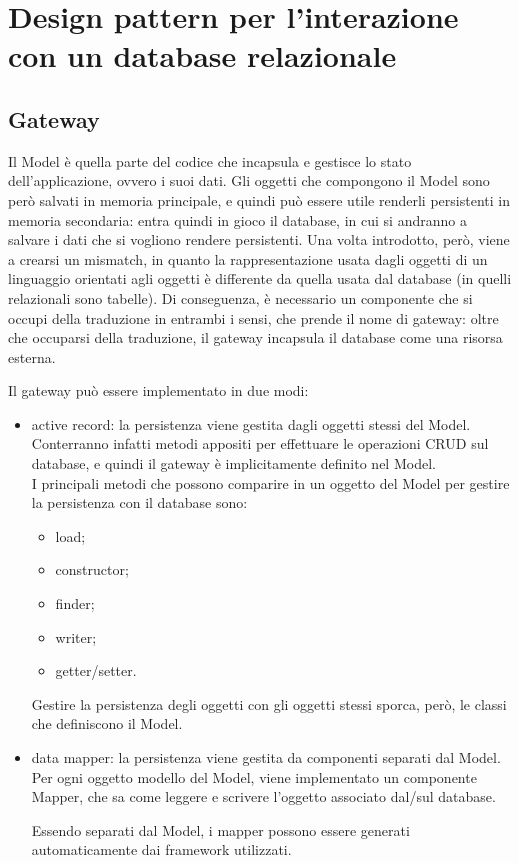 \chapter{Design pattern per l'interazione con un database relazionale}
\section{Gateway}
Il Model è quella parte del codice che incapsula e gestisce lo stato dell'applicazione, ovvero i suoi dati.
Gli oggetti che compongono il Model sono però salvati in memoria principale, e quindi può essere utile renderli persistenti in memoria secondaria: entra quindi in gioco il database, in cui si andranno a salvare i dati che si vogliono rendere persistenti.
Una volta introdotto, però, viene a crearsi un mismatch, in quanto la rappresentazione usata dagli oggetti di un linguaggio orientati agli oggetti è differente da quella usata dal database (in quelli relazionali sono tabelle). Di conseguenza, è necessario un componente che si occupi della traduzione in entrambi i sensi, che prende il nome di gateway: oltre che occuparsi della traduzione, il gateway incapsula il database come una risorsa esterna.

Il gateway può essere implementato in due modi:
\begin{itemize}
    \item active record: la persistenza viene gestita dagli oggetti stessi del Model. Conterranno infatti metodi appositi per effettuare le operazioni CRUD sul database, e quindi il gateway è implicitamente definito nel Model.\\
    I principali metodi che possono comparire in un oggetto del Model per gestire la persistenza con il database sono:
    \begin{itemize}
        \item load;
        \item constructor;
        \item finder;
        \item writer;
        \item getter/setter.
    \end{itemize}
    Gestire la persistenza degli oggetti con gli oggetti stessi sporca, però, le classi che definiscono il Model.
    \item data mapper: la persistenza viene gestita da componenti separati dal Model.
    Per ogni oggetto modello del Model, viene implementato un componente Mapper, che sa come leggere e scrivere l'oggetto associato dal/sul database.

    Essendo separati dal Model, i mapper possono essere generati automaticamente dai framework utilizzati.
\end{itemize}

